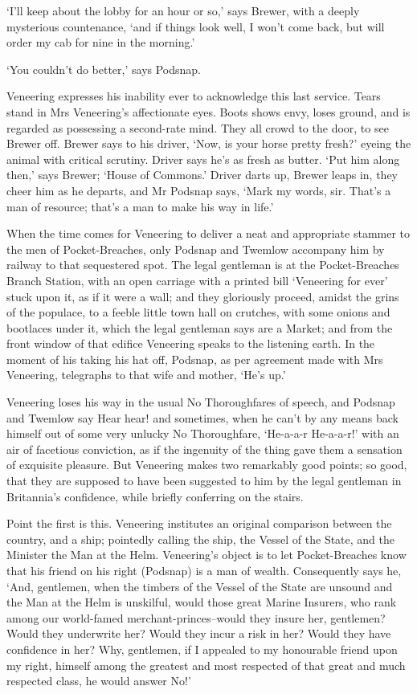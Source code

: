 ‘I’ll keep about the lobby for an hour or so,’ says Brewer, with a
deeply mysterious countenance, ‘and if things look well, I won’t come
back, but will order my cab for nine in the morning.’

‘You couldn’t do better,’ says Podsnap.

Veneering expresses his inability ever to acknowledge this last service.
Tears stand in Mrs Veneering’s affectionate eyes. Boots shows envy,
loses ground, and is regarded as possessing a second-rate mind. They all
crowd to the door, to see Brewer off. Brewer says to his driver, ‘Now,
is your horse pretty fresh?’ eyeing the animal with critical scrutiny.
Driver says he’s as fresh as butter. ‘Put him along then,’ says Brewer;
‘House of Commons.’ Driver darts up, Brewer leaps in, they cheer him as
he departs, and Mr Podsnap says, ‘Mark my words, sir. That’s a man of
resource; that’s a man to make his way in life.’

When the time comes for Veneering to deliver a neat and appropriate
stammer to the men of Pocket-Breaches, only Podsnap and Twemlow
accompany him by railway to that sequestered spot. The legal gentleman
is at the Pocket-Breaches Branch Station, with an open carriage with a
printed bill ‘Veneering for ever’ stuck upon it, as if it were a wall;
and they gloriously proceed, amidst the grins of the populace, to a
feeble little town hall on crutches, with some onions and bootlaces
under it, which the legal gentleman says are a Market; and from the
front window of that edifice Veneering speaks to the listening earth.
In the moment of his taking his hat off, Podsnap, as per agreement made
with Mrs Veneering, telegraphs to that wife and mother, ‘He’s up.’

Veneering loses his way in the usual No Thoroughfares of speech, and
Podsnap and Twemlow say Hear hear! and sometimes, when he can’t by any
means back himself out of some very unlucky No Thoroughfare, ‘He-a-a-r
He-a-a-r!’ with an air of facetious conviction, as if the ingenuity of
the thing gave them a sensation of exquisite pleasure. But Veneering
makes two remarkably good points; so good, that they are supposed
to have been suggested to him by the legal gentleman in Britannia’s
confidence, while briefly conferring on the stairs.

Point the first is this. Veneering institutes an original comparison
between the country, and a ship; pointedly calling the ship, the Vessel
of the State, and the Minister the Man at the Helm. Veneering’s object
is to let Pocket-Breaches know that his friend on his right (Podsnap) is
a man of wealth. Consequently says he, ‘And, gentlemen, when the timbers
of the Vessel of the State are unsound and the Man at the Helm is
unskilful, would those great Marine Insurers, who rank among our
world-famed merchant-princes--would they insure her, gentlemen? Would
they underwrite her? Would they incur a risk in her? Would they have
confidence in her? Why, gentlemen, if I appealed to my honourable friend
upon my right, himself among the greatest and most respected of that
great and much respected class, he would answer No!’

